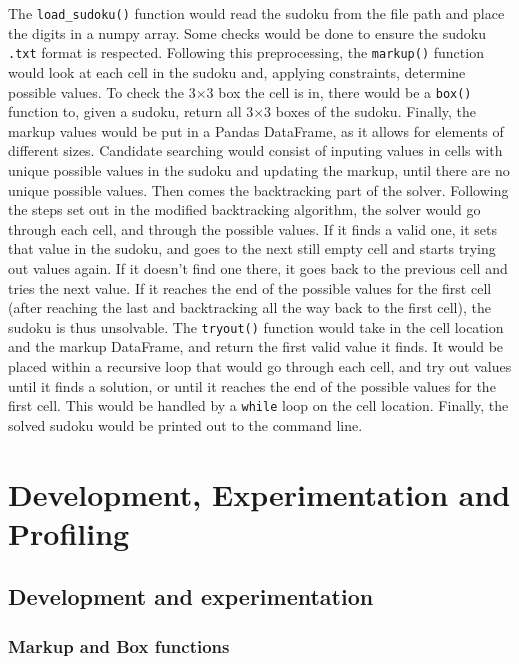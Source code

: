 \documentclass[12pt]{report} %
\begin{document}
\vspace*{1\baselineskip}
The \texttt{load\_sudoku()} function would read the sudoku from the file path and place the digits in a numpy array. Some checks would be done to ensure the sudoku \texttt{.txt} format is respected.
Following this preprocessing, the \texttt{markup()} function would look at each cell in the sudoku and, applying constraints, determine possible values. To check the 3$\times$3 box the cell is in, there would be a \texttt{box()} function to, given a sudoku, return all 3$\times$3 boxes of the sudoku. Finally, the markup values would be put in a Pandas DataFrame, as it allows for elements of different sizes.
Candidate searching would consist of inputing values in cells with unique possible values in the sudoku and updating the markup, until there are no unique possible values.
Then comes the backtracking part of the solver. Following the steps set out in the modified backtracking algorithm, the solver would go through each cell, and through the possible values. If it finds a valid one, it sets that value in the sudoku, and goes to the next still empty cell and starts trying out values again. If it doesn't find one there, it goes back to the previous cell and tries the next value. If it reaches the end of the possible values for the first cell (after reaching the last and backtracking all the way back to the first cell), the sudoku is thus unsolvable. The \texttt{tryout()} function would take in the cell location and the markup DataFrame, and return the first valid value it finds. It would be placed within a recursive loop that would go through each cell, and try out values until it finds a solution, or until it reaches the end of the possible values for the first cell. This would be handled by a \texttt{while} loop on the cell location.
Finally, the solved sudoku would be printed out to the command line.


\chapter{Development, Experimentation and Profiling}

\section{Development and experimentation}

\subsection{Markup and Box functions}
\end{document}

